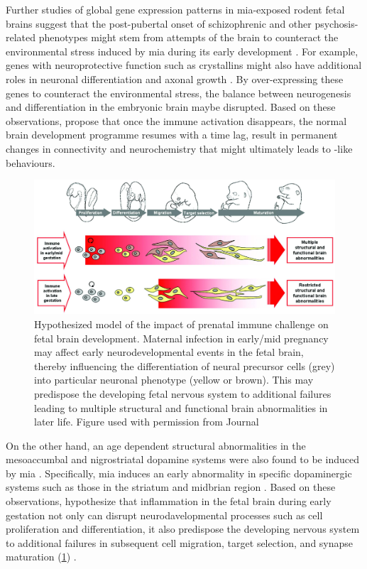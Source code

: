 	Further studies of global gene expression patterns in \gls{mia}-exposed rodent fetal brains \citep{Oskvig2012,Garbett2012a} suggest that the post-pubertal onset of schizophrenic and other psychosis-related phenotypes might stem from attempts of the brain to counteract the environmental stress induced by \gls{mia} during its early development \citep{Garbett2012a}.
	For example, genes with neuroprotective function such as crystallins might also have additional roles in neuronal differentiation and axonal growth \citep{Garbett2012a}. 
	By over-expressing these genes to counteract the environmental stress, the balance between neurogenesis and differentiation in the embryonic brain maybe disrupted. 
	Based on these observations, \citet{Garbett2012a} propose that once the immune activation disappears, the normal brain development programme resumes with a time lag, result in permanent changes in connectivity and neurochemistry that might ultimately leads to -like behaviours.
	\begin{figure}
		\centering
		\includegraphics[width=\textwidth]{figure/mia_impact.jpg}
		\caption[Hypothesized model of the impact of prenatal immune challenge on fetal brain development]{Hypothesized model of the impact of prenatal immune challenge on fetal brain development.
			Maternal infection in early/mid pregnancy may affect early neurodevelopmental events in the fetal brain, thereby influencing the differentiation of neural precursor cells (grey) into particular neuronal phenotype (yellow or brown).
			This may predispose the developing fetal nervous system to additional failures leading to multiple structural and functional brain abnormalities in later life.
			Figure used with permission from Journal \citep{Meyer2007a}}
		\label{fig:miaEffect}
	\end{figure}
	
	On the other hand, an age dependent structural abnormalities in the mesoaccumbal and nigrostriatal dopamine systems were also found to be induced by \gls{mia} \citep{Vuillermot2010}.
	Specifically, \gls{mia} induces an early abnormality in specific dopaminergic systems such as those in the striatum and midbrian region \citep{Vuillermot2010}.
	Based on these observations, \citet{Meyer2007a} hypothesize that inflammation in the fetal brain during early gestation not only can disrupt neurodavelopmental processes such as cell proliferation and differentiation, it also predispose the developing nervous system to additional failures in subsequent cell migration, target selection, and synapse maturation (\cref{fig:miaEffect}) \citep{Meyer2007a}.
		
